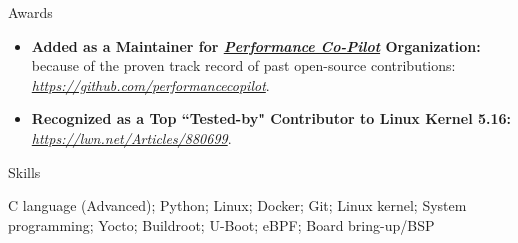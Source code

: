 \documentclass[]{Sohaib-Mohamed}
\begin{document}
\begin{cvsection}{Awards}
   \begin{cvsubsection}{}{}{}
      \begin{itemize}
         \item \textbf{Added as a Maintainer for \href{https://github.com/performancecopilot}{\textit{Performance Co-Pilot}} Organization:} because of the proven track record of past open-source contributions: \href{https://github.com/performancecopilot}{\textit{https://github.com/performancecopilot}}.
         \item \textbf{Recognized as a Top ``Tested-by" Contributor to Linux Kernel 5.16:} \href{https://lwn.net/Articles/880699/}{\textit{https://lwn.net/Articles/880699}}.
      \end{itemize}
   \end{cvsubsection}
\end{cvsection}


\begin{cvsection}{Skills}
   \begin{cvsubsection}{}{}{}
      C language (Advanced); Python; Linux; Docker; Git; Linux kernel; System programming; Yocto; Buildroot; U-Boot; eBPF; Board bring-up/BSP
   \end{cvsubsection}
\end{cvsection}
\end{document}
